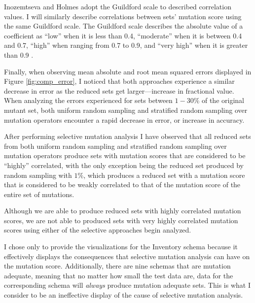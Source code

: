 \documentclass[conference]{IEEEtran}
\begin{document}
Inozemtseva and Holmes adopt the Guildford scale to described correlation values. I will similarly
describe correlations between sets' mutation score using the same Guildford scale.
The Guildford scale describes the absolute value of a coefficient as ``low'' when it is less than 0.4,
``moderate'' when it is between 0.4 and 0.7, ``high'' when ranging from 0.7 to 0.9, and ``very high''
when it is greater than 0.9 \cite{inozemtseva2014coverage}.

Finally, when observing mean absolute and root mean squared errors displayed in Figure \ref{fig:comp_error},
I noticed that both approaches experience a similar decrease in error as the reduced sets
get larger---increase in fractional value. When analyzing the errors experienced for sets between
$1 - 30\%$ of the original mutant set, both uniform random sampling and stratified random sampling over mutation operators
encounter a rapid decrease in error, or increase in accuracy.

After performing selective mutation analysis I have observed that all reduced sets from both
uniform random sampling and stratified random sampling over mutation operators produce sets with mutation scores that are
considered to be ``highly'' correlated, with the only exception
being the reduced set produced by random sampling with $1\%$, which produces a reduced set with a mutation score that is considered
to be weakly correlated to that of the mutation score of the entire set of mutations.

Although we are able to produce
reduced sets with highly correlated mutation scores, we are not able to produced sets with
very highly correlated mutation scores using either of the selective approaches begin analyzed.

I chose only to provide the visualizations for the Inventory schema because it effectively displays
the consequences that selective mutation analysis can have on the mutation score. Additionally,
there are nine schemas that are mutation adequate, meaning that no matter how small the test data
are, data for the corresponding schema will \textit{always} produce mutation adequate sets. This is what I consider
to be an ineffective display of the cause of selective mutation analysis.


\begin{figure*}[!hb]
\centering
{}
\hfil
{}
\caption{The errors for uniform random sampling and stratified random sampling over operators for the Inventory schema.}
\label{fig:comp_error}
\end{figure*}
\end{document}
